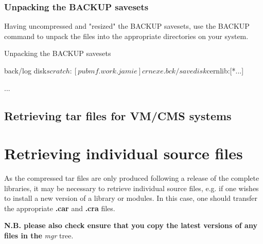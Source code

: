 \subsection{Unpacking the BACKUP savesets}

Having uncompressed and "resized" the BACKUP savesets, use
the BACKUP command to unpack the files into the appropriate
directories on your system.

\begin{XMPt}{Unpacking the BACKUP savesets}

back/log disk$scratch:[pubmf.work.jamie]crnexe.bck/save disk$cernlib:[*...]

...

\end{XMPt}


\section{Retrieving tar files for VM/CMS systems}

\chapter{Retrieving individual source files}
\label{sect-NEW}

As the compressed tar files are only produced following a release
of the complete libraries, it may be necessary to retrieve individual
source files, e.g. if one wishes to install a new version of
a library or modules. In this case, one should transfer the
appropriate {\bf .car} and {\bf .cra} files. 

{\bf N.B. please also check ensure that you copy the latest versions
of any files in the} {\it mgr} tree.

